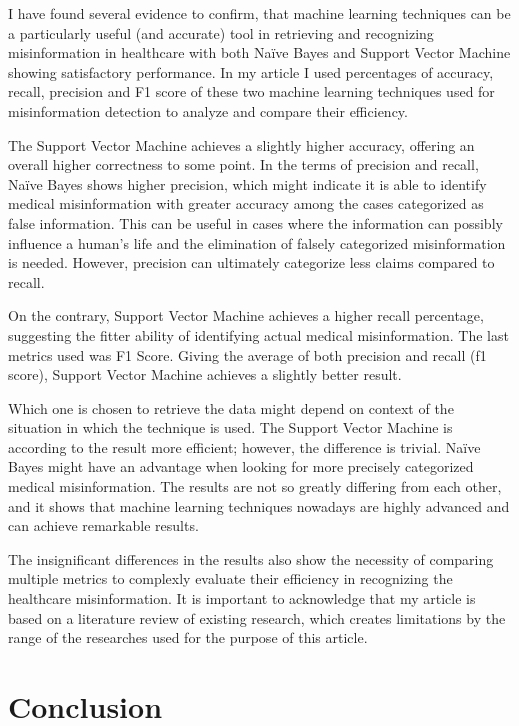 \documentclass[11pt ,english,a4paper]{article}
\begin{document}
I have found several evidence to confirm, that machine learning techniques can be a particularly useful (and accurate) tool in retrieving and recognizing misinformation in healthcare with both Naïve Bayes and Support Vector Machine showing satisfactory performance. In my article I used percentages of accuracy, recall, precision and F1 score of these two machine learning techniques used for misinformation detection to analyze and compare their efficiency. 

The Support Vector Machine achieves a slightly higher accuracy, offering an overall higher correctness to some point. In the terms of precision and recall, Naïve Bayes shows higher precision, which might indicate it is able to identify medical misinformation with greater accuracy among the cases categorized as false information. This can be useful in cases where the information can possibly influence a human's life and the elimination of falsely categorized misinformation is needed. However, precision can ultimately categorize less claims compared to recall.

On the contrary, Support Vector Machine achieves a higher recall percentage, suggesting the fitter ability of identifying actual medical misinformation. The last metrics used was F1 Score. Giving the average of both precision and recall (f1 score), Support Vector Machine achieves a slightly better result.

Which one is chosen to retrieve the data might depend on context of the situation in which the technique is used. The Support Vector Machine is according to the result more efficient; however, the difference is trivial. Naïve Bayes might have an advantage when looking for more precisely categorized medical misinformation. The results are not so greatly differing from each other, and it shows that machine learning techniques nowadays are highly advanced and can achieve remarkable results. 

The insignificant differences in the results also show the necessity of comparing multiple metrics to complexly evaluate their efficiency in recognizing the healthcare misinformation.
It is important to acknowledge that my article is based on a literature review of existing research, which creates limitations by the range of the researches used for the purpose of this article.

\section{Conclusion}\label{conclusion}
\end{document}
